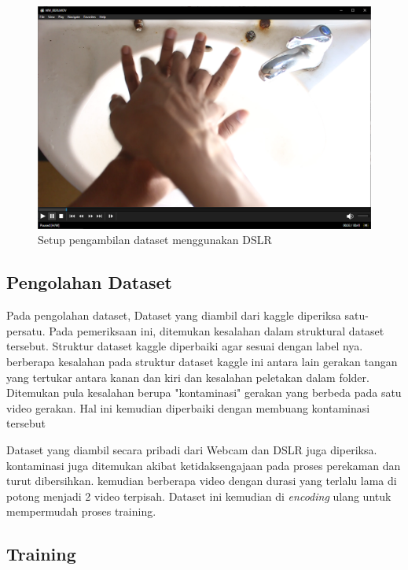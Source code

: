 \begin{figure}[!ht]
	\centering
	\includegraphics[width=0.8\columnwidth]{gambar/contohdslr2.png}
	\caption{Setup pengambilan dataset menggunakan DSLR}
	\label{fig:contohdslr}
\end{figure}

\subsection{Pengolahan Dataset}
\label{subsec:pengolahandataset}

Pada pengolahan dataset, Dataset yang diambil dari kaggle diperiksa satu-persatu. Pada pemeriksaan ini, ditemukan kesalahan dalam struktural dataset tersebut. Struktur dataset kaggle diperbaiki agar sesuai dengan label nya. berberapa kesalahan pada struktur dataset kaggle ini antara lain gerakan tangan yang tertukar antara kanan dan kiri dan kesalahan peletakan dalam folder. Ditemukan pula kesalahan berupa "kontaminasi" gerakan yang berbeda pada satu video gerakan. Hal ini kemudian diperbaiki dengan membuang kontaminasi tersebut

Dataset yang diambil secara pribadi dari Webcam dan DSLR juga diperiksa. kontaminasi juga ditemukan akibat ketidaksengajaan pada proses perekaman dan turut dibersihkan. kemudian berberapa video dengan durasi yang terlalu lama di potong menjadi 2 video terpisah. Dataset ini kemudian di \textit{encoding} ulang untuk mempermudah proses training.

\subsection{Training}
\label{subsec:trainigg}

\


